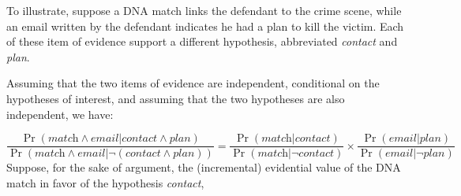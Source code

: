\documentclass[10pt]{article}
\begin{document}
To illustrate, suppose a DNA match links the defendant to the crime scene, while an email written by the defendant indicates 
he had a plan to kill the victim. Each of these item of evidence support a different hypothesis, abbreviated
 \textit{contact} and \textit{plan}.

%
 Assuming that the two items of evidence are independent, conditional on 
 the hypotheses of interest, and assuming that the two hypotheses 
 are also independent, we have:

 \[
 \frac{\Pr(\textit{match} \wedge \textit{email} | \textit{contact}\wedge \textit{plan})}{\Pr(\textit{match} \wedge \textit{email} | \neg (\textit{contact} \wedge \textit{plan}))} 
 = \frac{\Pr(\textit{match} | \textit{contact})}{\Pr(\textit{match} | \neg \textit{contact})} \times 
 \frac{\Pr( \textit{email} | \textit{plan})}{\Pr(\textit{email} | \neg \textit{plan})} 
 \]
Suppose, for the sake of argument, the (incremental) 
evidential value of the DNA match in favor 
of the hypothesis \textit{contact}, 
\end{document}
